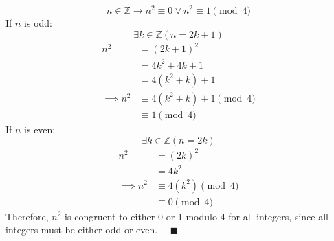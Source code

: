 \documentclass[letterpaper, 12pt]{article}
\newcommand{\qed}{\quad \blacksquare}
\newcommand{\then}{\rightarrow}
\newcommand{\Z}{\mathbb{Z}}
\newcommand{\0}{\emptyset}
\begin{document}
\begin{enumerate}
\[n \in \Z \then n^2 \equiv 0 \vee n^2 \equiv 1 \pmod 4\]
If $n$ is odd:
\[\exists k \in \Z (n = 2k + 1)\]
\begin{align*}
    n^2 &= (2k + 1)^2 \\
    &= 4k^2 + 4k + 1 \\
    &= 4(k^2 + k) + 1 \\
    \implies n^2 &\equiv 4(k^2 + k) + 1 \pmod 4 \\
    &\equiv 1 \pmod 4
\end{align*}
If $n$ is even:
\[\exists k \in \Z (n = 2k)\]
\begin{align*}
    n^2 &= (2k)^2 \\
    &= 4k^2 \\
    \implies n^2 &\equiv 4(k^2) \pmod 4 \\
    &\equiv 0 \pmod 4
\end{align*}
Therefore, $n^2$ is congruent to either 0 or 1 modulo 4 for all integers, since all integers 
must be either odd or even. $\qed$
\end{enumerate}
\end{document}
